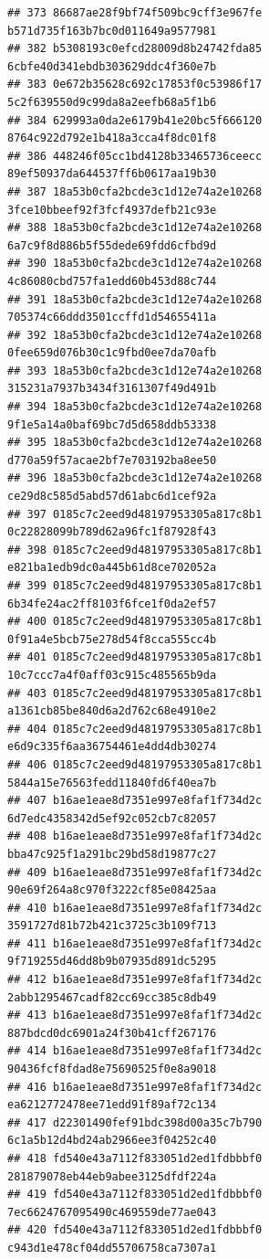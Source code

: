 \documentclass[]{article}
\begin{document}
\begin{verbatim}
## 373 86687ae28f9bf74f509bc9cff3e967fe   b571d735f163b7bc0d011649a9577981
## 382 b5308193c0efcd28009d8b24742fda85   6cbfe40d341ebdb303629ddc4f360e7b
## 383 0e672b35628c692c17853f0c53986f17   5c2f639550d9c99da8a2eefb68a5f1b6
## 384 629993a0da2e6179b41e20bc5f666120   8764c922d792e1b418a3cca4f8dc01f8
## 386 448246f05cc1bd4128b33465736ceecc   89ef50937da644537ff6b0617aa19b30
## 387 18a53b0cfa2bcde3c1d12e74a2e10268   3fce10bbeef92f3fcf4937defb21c93e
## 388 18a53b0cfa2bcde3c1d12e74a2e10268   6a7c9f8d886b5f55dede69fdd6cfbd9d
## 390 18a53b0cfa2bcde3c1d12e74a2e10268   4c86080cbd757fa1edd60b453d88c744
## 391 18a53b0cfa2bcde3c1d12e74a2e10268   705374c66ddd3501ccffd1d54655411a
## 392 18a53b0cfa2bcde3c1d12e74a2e10268   0fee659d076b30c1c9fbd0ee7da70afb
## 393 18a53b0cfa2bcde3c1d12e74a2e10268   315231a7937b3434f3161307f49d491b
## 394 18a53b0cfa2bcde3c1d12e74a2e10268   9f1e5a14a0baf69bc7d5d658ddb53338
## 395 18a53b0cfa2bcde3c1d12e74a2e10268   d770a59f57acae2bf7e703192ba8ee50
## 396 18a53b0cfa2bcde3c1d12e74a2e10268   ce29d8c585d5abd57d61abc6d1cef92a
## 397 0185c7c2eed9d48197953305a817c8b1   0c22828099b789d62a96fc1f87928f43
## 398 0185c7c2eed9d48197953305a817c8b1   e821ba1edb9dc0a445b61d8ce702052a
## 399 0185c7c2eed9d48197953305a817c8b1   6b34fe24ac2ff8103f6fce1f0da2ef57
## 400 0185c7c2eed9d48197953305a817c8b1   0f91a4e5bcb75e278d54f8cca555cc4b
## 401 0185c7c2eed9d48197953305a817c8b1   10c7ccc7a4f0aff03c915c485565b9da
## 403 0185c7c2eed9d48197953305a817c8b1   a1361cb85be840d6a2d762c68e4910e2
## 404 0185c7c2eed9d48197953305a817c8b1   e6d9c335f6aa36754461e4dd4db30274
## 406 0185c7c2eed9d48197953305a817c8b1   5844a15e76563fedd11840fd6f40ea7b
## 407 b16ae1eae8d7351e997e8faf1f734d2c   6d7edc4358342d5ef92c052cb7c82057
## 408 b16ae1eae8d7351e997e8faf1f734d2c   bba47c925f1a291bc29bd58d19877c27
## 409 b16ae1eae8d7351e997e8faf1f734d2c   90e69f264a8c970f3222cf85e08425aa
## 410 b16ae1eae8d7351e997e8faf1f734d2c   3591727d81b72b421c3725c3b109f713
## 411 b16ae1eae8d7351e997e8faf1f734d2c   9f719255d46dd8b9b07935d891dc5295
## 412 b16ae1eae8d7351e997e8faf1f734d2c   2abb1295467cadf82cc69cc385c8db49
## 413 b16ae1eae8d7351e997e8faf1f734d2c   887bdcd0dc6901a24f30b41cff267176
## 414 b16ae1eae8d7351e997e8faf1f734d2c   90436fcf8fdad8e75690525f0e8a9018
## 416 b16ae1eae8d7351e997e8faf1f734d2c   ea6212772478ee71edd91f89af72c134
## 417 d22301490fef91bdc398d00a35c7b790   6c1a5b12d4bd24ab2966ee3f04252c40
## 418 fd540e43a7112f833051d2ed1fdbbbf0   281879078eb44eb9abee3125dfdf224a
## 419 fd540e43a7112f833051d2ed1fdbbbf0   7ec6624767095490c469559de77ae043
## 420 fd540e43a7112f833051d2ed1fdbbbf0   c943d1e478cf04dd55706758ca7307a1

\end{verbatim}
\end{document}

